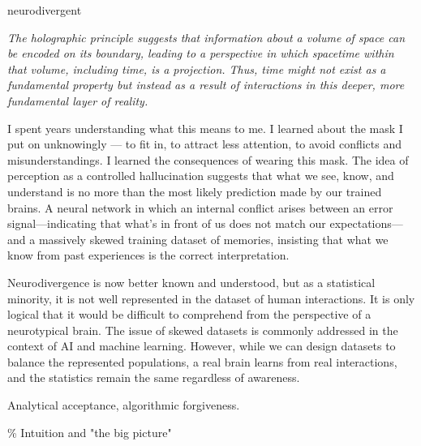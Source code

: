 


\begin{center}
\vspace*{\fill}
\Huge neurodivergent

\vspace{2cm}

\begin{flushright}
\large
\textit{The holographic principle suggests that information about a volume of space can be encoded on its boundary, leading to a perspective in which spacetime within that volume, including time, is a projection. Thus, time might not exist as a fundamental property but instead as a result of interactions in this deeper, more fundamental layer of reality.}
\end{flushright}

\vspace*{\fill}
\end{center}

\normalsize

I spent years understanding what this means to me. I learned about the mask I put on unknowingly — to fit in, to attract less attention, to avoid conflicts and misunderstandings. I learned the consequences of wearing this mask. The idea of perception as a controlled hallucination suggests that what we see, know, and understand is no more than the most likely prediction made by our trained brains. A neural network in which an internal conflict arises between an error signal—indicating that what’s in front of us does not match our expectations—and a massively skewed training dataset of memories, insisting that what we know from past experiences is the correct interpretation.

Neurodivergence is now better known and understood, but as a statistical minority, it is not well represented in the dataset of human interactions. It is only logical that it would be difficult to comprehend from the perspective of a neurotypical brain. The issue of skewed datasets is commonly addressed in the context of AI and machine learning. However, while we can design datasets to balance the represented populations, a real brain learns from real interactions, and the statistics remain the same regardless of awareness.

Analytical acceptance, algorithmic forgiveness.

{\scriptsize \textcolor{comment}{\%  Intuition and "the big picture" }}

